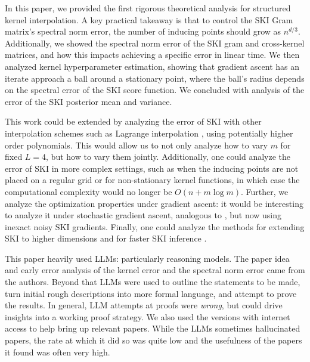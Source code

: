 
In this paper, we provided the first rigorous theoretical analysis for structured kernel interpolation. A key practical takeaway is that to control the SKI Gram matrix's spectral norm error, the number of inducing points should grow as $n^{d/3}$. Additionally, we showed the spectral norm error of the SKI gram and cross-kernel matrices, and how this impacts achieving a specific error in linear time. We then analyzed kernel hyperparameter estimation, showing that gradient ascent has an iterate approach a ball around a stationary point, where the ball's radius depends on the spectral error of the SKI score function. We concluded with analysis of the error of the SKI posterior mean and variance.

This work could be extended by analyzing the error of SKI with other interpolation schemes such as Lagrange interpolation \citep{lagrange1795lecons}, using potentially higher order polynomials. This would allow us to not only analyze how to vary $m$ for fixed $L=4$, but how to vary them jointly. Additionally, one could analyze the error of SKI in more complex settings, such as when the inducing points are not placed on a regular grid \citep{snelson2006sparse} or for non-stationary kernel functions, in which case the computational complexity would no longer be $O(n+m\log m)$. Further, we analyze the optimization properties under gradient ascent: it would be interesting to analyze it under stochastic gradient ascent, analogous to \cite{lin2024stochastic}, but now using inexact noisy SKI gradients. Finally, one could analyze the methods for extending SKI to higher dimensions \cite{kapoor2021skiing,yadav2022kernel} and for faster SKI inference \cite{yadav2021faster}.

This paper heavily used LLMs: particularly reasoning models. The paper idea and early error analysis of the kernel error and the spectral norm error came from the authors. Beyond that LLMs were used to outline the statements to be made, turn initial rough descriptions into more formal language, and attempt to prove the results. In general, LLM attempts at proofs were \textit{wrong}, but could drive insights into a working proof strategy. We also used the versions with internet access to help bring up relevant papers. While the LLMs sometimes hallucinated papers, the rate at which it did so was quite low and the usefulness of the papers it found was often very high.
